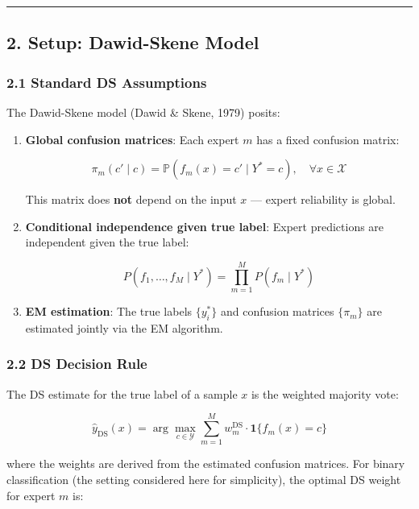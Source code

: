 \documentclass[
  12pt,
]{ctexart}
\begin{document}
\begin{center}\rule{0.5\linewidth}{0.5pt}\end{center}

\subsection{2. Setup: Dawid-Skene Model}\label{setup-dawid-skene-model}

\subsubsection{2.1 Standard DS
Assumptions}\label{standard-ds-assumptions}

The Dawid-Skene model (Dawid \& Skene, 1979) posits:

\begin{enumerate}
\def\labelenumi{\arabic{enumi}.}
\item
  \textbf{Global confusion matrices}: Each expert \(m\) has a fixed
  confusion matrix:

  \[\pi_m(c' \mid c) = \mathbb{P}(f_m(x) = c' \mid Y^* = c), \quad \forall x \in \mathcal{X}\]

  This matrix does \textbf{not} depend on the input \(x\) --- expert
  reliability is global.
\item
  \textbf{Conditional independence given true label}: Expert predictions
  are independent given the true label:

  \[P(f_1, \dots, f_M \mid Y^*) = \prod_{m=1}^M P(f_m \mid Y^*)\]
\item
  \textbf{EM estimation}: The true labels \(\{y_i^*\}\) and confusion
  matrices \(\{\pi_m\}\) are estimated jointly via the EM algorithm.
\end{enumerate}

\subsubsection{2.2 DS Decision Rule}\label{ds-decision-rule}

The DS estimate for the true label of a sample \(x\) is the weighted
majority vote:

\[\hat{y}_{\text{DS}}(x) = \arg\max_{c \in \mathcal{Y}} \sum_{m=1}^M w_m^{\text{DS}} \cdot \mathbf{1}\{f_m(x) = c\}\]

where the weights are derived from the estimated confusion matrices. For
binary classification (the setting considered here for simplicity), the
optimal DS weight for expert \(m\) is:
\end{document}
